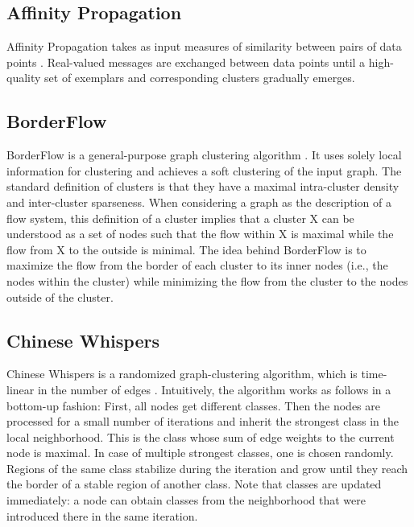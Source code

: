 \documentclass[a4paper, 11pt]{article}
\begin{document}
	\subsection{Affinity Propagation} \label{sec:ap}
		Affinity Propagation takes as input measures of similarity between pairs of data points \cite{ap}. 
		Real-valued messages are exchanged between data points until a high-quality set of exemplars and corresponding clusters
		gradually emerges. %

	\subsection{BorderFlow} \label{sec:bf}
		BorderFlow is a general-purpose graph clustering algorithm \cite{4}. 
		It uses solely local information for clustering and achieves a soft clustering of the input graph. 
		The standard definition of clusters is that they have a maximal intra-cluster density and inter-cluster sparseness. 
		When considering a graph as the description of a flow system, this definition of a cluster implies that a cluster X 
		can be understood as a set of nodes such that the flow within X is maximal while the flow from X to the outside is minimal. 
		The idea behind BorderFlow is to maximize the flow from the border of each cluster to its inner nodes (i.e., the nodes within the cluster) 
		while minimizing the flow from the cluster to the nodes outside of the cluster.
		
	\subsection{Chinese Whispers} \label{sec:cw}
		Chinese Whispers is a randomized graph-clustering algorithm, which is time-linear in the number of edges \cite{Bie06a}.
		Intuitively, the algorithm works as follows in a bottom-up fashion: First, all nodes get different
		classes. Then the nodes are processed for a small number of iterations and inherit the strongest class
		in the local neighborhood. This is the class whose sum of edge weights to the current node is
		maximal. In case of multiple strongest classes, one is chosen randomly. Regions of the same class
		stabilize during the iteration and grow until they reach the border of a stable region of another class.
		Note that classes are updated immediately: a node can obtain classes from the neighborhood that were
		introduced there in the same iteration.
	
\end{document}
